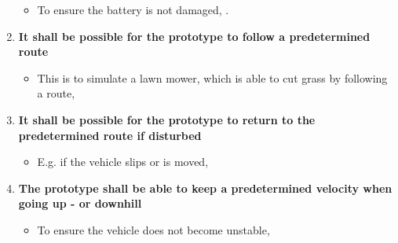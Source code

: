 \begin{enumerate}
\begin{itemize}
	\item[] To ensure the battery is not damaged, .
	\end{itemize}
\item \textbf{It shall be possible for the prototype to follow a predetermined route}
	\begin{itemize}
	\item[] This is to simulate a lawn mower, which is able to cut grass by following a route, 
	\end{itemize}
\item \textbf{It shall be possible for the prototype to return to the predetermined route if disturbed}
	\begin{itemize}
	\item[] E.g. if the vehicle slips or is moved, 
	\end{itemize}
\item \textbf{The prototype shall be able to keep a predetermined velocity when going up - or downhill}
	\begin{itemize}
	\item[] To ensure the vehicle does not become unstable, 
	\end{itemize}
\end{enumerate}
